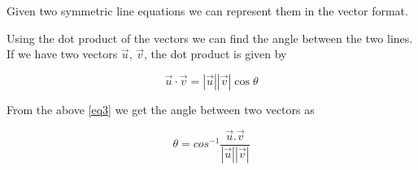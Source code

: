 \documentclass[journal,12pt,twocolumn]{IEEEtran}
\begin{document}
	Given two symmetric line equations we can represent them in the vector format.
	
	Using the dot product of the vectors we can find the angle between the two lines. If we have two vectors $\vec{u}$, $\vec{v}$, the dot product is given by 
	
	\begin{equation}\label{eq3}
		\vec{u}\cdot\vec{v} = |\vec{u}||\vec{v}|\cos \theta
	\end{equation}
	
	From the above \ref{eq3} we get the angle between two vectors as
	
	\begin{equation}\label{eq4}
		\theta = cos^{-1}\frac{\vec{u}.\vec{v}}{|\vec{u}||\vec{v}|}
	\end{equation}
	
	
\end{document}
